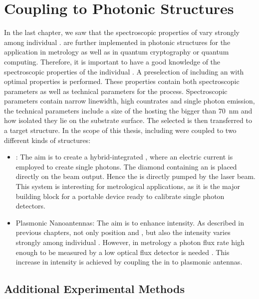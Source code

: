 
\chapter[Coupling NDs]{Coupling \Nds to Photonic Structures}	\label{ch::coupling}

	In the last chapter, we saw that the spectroscopic properties of \sivs vary strongly among individual \nds.
	\Nds are further implemented in photonic structures for the application in metrology as well as in quantum cryptography or quantum computing.
	Therefore, it is important to have a good knowledge of the spectroscopic properties of the individual  \siv.
	A preselection of \nds including an \siv with optimal properties is performed.
	These properties contain both spectroscopic parameters as well as technical parameters for the \pp process.
	Spectroscopic parameters contain narrow linewidth, high countrates and single photon emission, the technical parameters include a size of the \nds hosting the \siv bigger than \SI{70}{nm} and how isolated they lie on the substrate surface.
	The selected \nd is then transferred to a target structure.
	In the scope of this thesis, \nds including \sivs were coupled to two different kinds of structures:
	\begin{itemize}
		\item \Vcsels: The aim is to create a hybrid-integrated \sps, where an electric current is employed to create single photons. The diamond containing an \siv is placed directly on the beam output. Hence the \siv is directly pumped by the laser beam. This system is interesting for metrological applications, as it is the major building block for a portable device ready to calibrate single photon detectors.
		\item Plasmonic Nanoantennas: The aim is to enhance \pl intensity. As described in previous chapters, not only \ZPL position and \lw, but also the \pl intensity varies strongly among individual \sivs. However, in metrology a photon flux rate high enough to be measured by a low optical flux detector is needed \cite{Vaigu2017}. This increase in intensity is achieved by coupling the \sivs in \nds to plasmonic antennas.
	\end{itemize}


	\section{Additional Experimental Methods}


